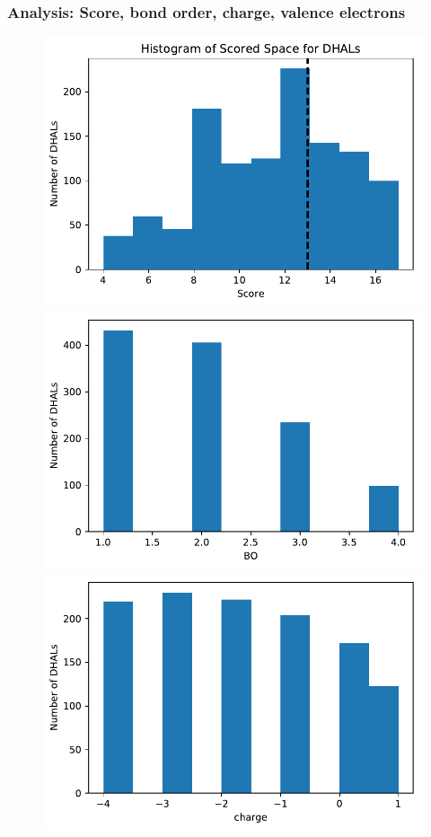 \documentclass[xcolor=dvipsnames]{beamer}
\begin{document}
\begin{frame}
\frametitle{Analysis: Score, bond order, charge, valence electrons}
\begin{figure}[ht] 
	\begin{minipage}[b]{0.5\linewidth}
		\centering
		\includegraphics[width=.8\linewidth]{img/dhal_ss_hist.pdf} 
		\vspace{2ex}
	\end{minipage}%
	\begin{minipage}[b]{0.5\linewidth}
		\centering
		\includegraphics[width=.8\linewidth]{img/dhal_ss_hist_bo.pdf} 
		\vspace{2ex}
	\end{minipage} 
	\begin{minipage}[b]{0.5\linewidth}
		\centering
		\includegraphics[width=.8\linewidth]{img/dhal_ss_hist_charge.pdf} 

\end{minipage}
\end{figure}
\end{frame}
\end{document}
